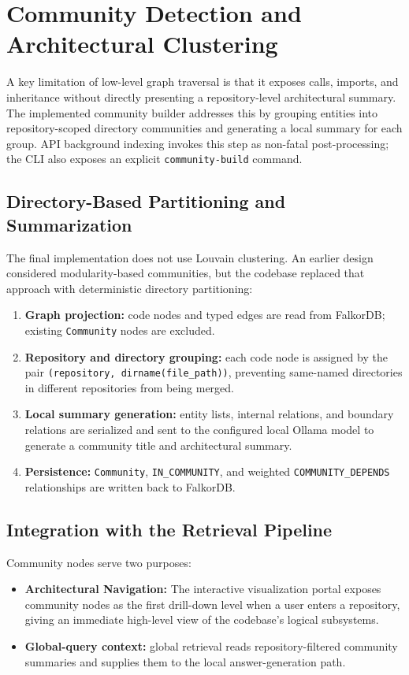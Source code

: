 \documentclass[12pt,letterpaper,oneside]{report}
\begin{document}
\section{Community Detection and Architectural Clustering}
\label{sec:community_detection}
A key limitation of low-level graph traversal is that it exposes calls, imports, and inheritance without directly presenting a repository-level architectural summary. The implemented community builder addresses this by grouping entities into repository-scoped directory communities and generating a local summary for each group. API background indexing invokes this step as non-fatal post-processing; the CLI also exposes an explicit \texttt{community-build} command.

\subsection{Directory-Based Partitioning and Summarization}
The final implementation does not use Louvain clustering. An earlier design considered modularity-based communities, but the codebase replaced that approach with deterministic directory partitioning:
\begin{enumerate}
    \item \textbf{Graph projection:} code nodes and typed edges are read from FalkorDB; existing \texttt{Community} nodes are excluded.
    \item \textbf{Repository and directory grouping:} each code node is assigned by the pair \texttt{(repository, dirname(file\_path))}, preventing same-named directories in different repositories from being merged.
    \item \textbf{Local summary generation:} entity lists, internal relations, and boundary relations are serialized and sent to the configured local Ollama model to generate a community title and architectural summary.
    \item \textbf{Persistence:} \texttt{Community}, \texttt{IN\_COMMUNITY}, and weighted \texttt{COMMUNITY\_DEPENDS} relationships are written back to FalkorDB.
\end{enumerate}

\subsection{Integration with the Retrieval Pipeline}
Community nodes serve two purposes:
\begin{itemize}
    \item \textbf{Architectural Navigation:} The interactive visualization portal exposes community nodes as the first drill-down level when a user enters a repository, giving an immediate high-level view of the codebase's logical subsystems.
    \item \textbf{Global-query context:} global retrieval reads repository-filtered community summaries and supplies them to the local answer-generation path.
\end{itemize}
\end{document}
